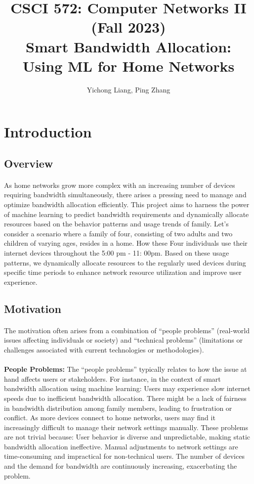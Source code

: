 \documentclass[10pt]{article}
\title{{\normalsize CSCI 572:  Computer Networks II (Fall 2023)}\\Smart Bandwidth Allocation: 
Using ML for Home Networks
}
\author{Yichong Liang, Ping Zhang}
\begin{document}
\maketitle

\section{Introduction}
\subsection{Overview}
\paragraph{}
As home networks grow more complex with an increasing number of devices requiring bandwidth simultaneously, there arises a pressing need to manage and optimize bandwidth allocation efficiently. This project aims to harness the power of machine learning to predict bandwidth requirements and dynamically allocate resources based on the behavior patterns and usage trends of family. Let's consider a scenario where a family of four, consisting of two adults and two children of varying ages, resides in a home. How these Four individuals use their internet devices throughout the 5:00 pm - 11: 00pm. Based on these usage patterns, we dynamically allocate resources to the regularly used devices during specific time periods to enhance network resource utilization and improve user experience.
\subsection{Motivation}
\paragraph{}
The motivation often arises from a combination of ``people problems'' (real-world issues affecting individuals or society) and ``technical problems'' (limitations or challenges associated with current technologies or methodologies). 

\paragraph{}
\textbf{People Problems:} The ``people problems'' typically relates to how the issue at hand affects users or stakeholders. For instance, in the context of smart bandwidth allocation using machine learning: Users may experience slow internet speeds due to inefficient bandwidth allocation. There might be a lack of fairness in bandwidth distribution among family members, leading to frustration or conflict. As more devices connect to home networks, users may find it increasingly difficult to manage their network settings manually. These problems are not trivial because: User behavior is diverse and unpredictable, making static bandwidth allocation ineffective. Manual adjustments to network settings are time-consuming and impractical for non-technical users. The number of devices and the demand for bandwidth are continuously increasing, exacerbating the problem.
\end{document}
